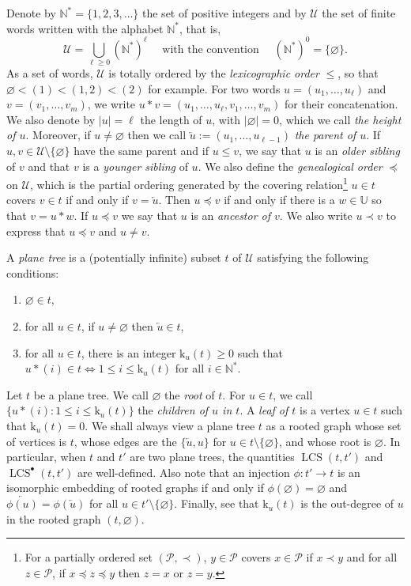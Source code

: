 \documentclass[11pt,reqno]{amsart}
\newcommand{\N}{\mathbb{N}}
\newcommand{\1}{\mathbf{1}}
\newcommand{\0}{\mathbf{0}}
\newcommand{\U}{\mathcal{U}}
\newcommand{\rk}{\mathrm{k}}
\newcommand{\LCS}{\operatorname{LCS}}
\renewcommand{\emptyset}{\varnothing}
\begin{document}
Denote by $\N^*=\{1,2,3,\ldots\}$ the set of positive integers and by $\U$ the set of finite words written with the alphabet $\N^*$, that is,
\[\U=\bigcup_{\ell\geq 0}(\N^*)^\ell\quad\text{ with the convention }\quad(\N^*)^0=\{\varnothing\}.\]
As a set of words, $\U$ is totally ordered by the \emph{lexicographic order} $\leq$, so that $\varnothing<(1)<(1,2)<(2)$ for example. For two words $u=(u_1,\ldots,u_\ell)$ and $v=(v_1,\ldots,v_m)$, we write $u*v=(u_1,\ldots,u_\ell,v_1,\ldots,v_m)$ for their concatenation. We also denote by $|u|=\ell$ the length of $u$, with $|\varnothing|=0$, which we call \emph{the height of $u$}. Moreover, if $u\neq\varnothing$ then we call $\overleftarrow{u}:=(u_1,\ldots,u_{\ell-1})$ \emph{the parent of $u$}. If $u,v\in \U\setminus\{\varnothing\}$ have the same parent and if $u\leq v$, we say that $u$ is an \emph{older sibling} of $v$ and that $v$ is a \emph{younger sibling} of $u$.  We also define the \emph{genealogical order} $\preceq$ on $\U$, which is the partial ordering generated by the covering relation\footnote{For a partially ordered set $(\mathcal{P},\prec)$, $y\in \mathcal{P}$ covers $x\in \mathcal{P}$ if $x\prec y$ and for all $z\in \mathcal{P}$, if $x\preceq z \preceq y$ then $z=x$ or $z=y$.} $u\in t$ covers $v\in t$ if and only if $v=\overleftarrow{u}$. Then $u\preceq v$ if and only if there is a $w\in \mathbb{U}$ so that $v=u*w$. If $u\preceq v$ we say that $u$ is an \emph{ancestor of $v$}. We also write $u \prec v$ to express that $u \preceq v$ and $u \ne v$. 

\begin{defn}
\label{def:tree}
A \emph{plane tree} is a (potentially infinite) subset $t$ of $\U$ satisfying the following conditions:
\begin{enumerate}
    \item[(a)] $\varnothing\in t$,
    \item[(b)] for all $u\in t$, if $u\neq\varnothing$ then $\overleftarrow{u}\in t$,
    \item[(c)] for all $u\in t$, there is an integer $\rk_u(t)\geq 0$ such that $u * (i)\in t \Leftrightarrow 1\leq i\leq  \rk_u(t)$ for all $i \in \N^*$.
\end{enumerate}
\end{defn}

Let $t$ be a plane tree. We call $\varnothing$ the \emph{root} of $t$. For $u\in t$, we call $\{u\! *\! (i) : 1\leq i \leq \rk_u(t)\}$ the \emph{children of $u$ in $t$}. A \emph{leaf of $t$} is a vertex $u\in t$ such that $\rk_u(t)=0$. We shall always view a plane tree $t$ as a rooted graph whose set of vertices is $t$, whose edges are the $\{\overleftarrow{u},u\}$ for $u\in t\setminus\{\varnothing\}$, and whose root is $\varnothing$. In particular, when $t$ and $t'$ are two plane trees, the quantities $\LCS(t,t')$ and $\LCS^\bullet(t,t')$ are well-defined. Also note that an injection $\phi:t'\to t$ is an isomorphic embedding of rooted graphs if and only if $\phi(\emptyset)=\emptyset$ and $\overleftarrow{\phi(u)}=\phi(\overleftarrow{u})$ for all $u\in t'\setminus\{\varnothing\}$. Finally, see that $\rk_u(t)$ is the out-degree of $u$ in the rooted graph $(t,\varnothing)$.
\smallskip
\end{document}
